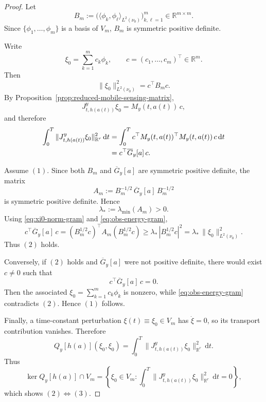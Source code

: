 \documentclass{article}
\theoremstyle{definition}
\renewcommand{\d}{\mathrm{d}}
\begin{document}
\begin{proof}
    Let
    \[
        B_m:=\bigl(\langle \phi_k,\phi_\ell\rangle_{L^2(\nu_0)}\bigr)_{k,\ell=1}^m
        \in \mathbb R^{m\times m}.
    \]
    Since \(\{\phi_1,\dots,\phi_m\}\) is a basis of \(V_m\), \(B_m\) is symmetric positive definite.

    Write
    \[
        \xi_0=\sum_{k=1}^m c_k\phi_k,
        \qquad
        c=(c_1,\dots,c_m)^\top\in\mathbb R^m.
    \]
    Then
    \begin{equation}
        \label{eq:xi0-norm-gram}
        \|\xi_0\|_{L^2(\nu_0)}^2
        =
        c^\top B_m c.
    \end{equation}
    By Proposition~\ref{prop:reduced-mobile-sensing-matrix},
    \[
        J_{t,h(a(t))}^{y}\xi_0
        =
        M_y(t,a(t))\,c,
    \]
    and therefore
    \begin{align}
        \int_0^T \|J_{t,h(a(t))}^{y}\xi_0\|_{\mathbb R^r}^2\,\d t
         & =
        \int_0^T c^\top M_y(t,a(t))^\top M_y(t,a(t))\,c\,\d t \notag \\
         & =
        c^\top \overline G_y[a]\,c.
        \label{eq:obs-energy-gram}
    \end{align}

    Assume \((1)\). Since both \(B_m\) and \(\overline G_y[a]\) are symmetric positive definite, the
    matrix
    \[
        A_m:=B_m^{-1/2}\,\overline G_y[a]\,B_m^{-1/2}
    \]
    is symmetric positive definite. Hence
    \[
        \lambda_*:=\lambda_{\min}(A_m)>0.
    \]
    Using \eqref{eq:xi0-norm-gram} and \eqref{eq:obs-energy-gram},
    \[
        c^\top \overline G_y[a]\,c
        =
        (B_m^{1/2}c)^\top A_m (B_m^{1/2}c)
        \ge
        \lambda_*\,|B_m^{1/2}c|^2
        =
        \lambda_*\,\|\xi_0\|_{L^2(\nu_0)}^2.
    \]
    Thus \((2)\) holds.

    Conversely, if \((2)\) holds and \(\overline G_y[a]\) were not positive definite, there would exist
    \(c\neq 0\) such that
    \[
        c^\top \overline G_y[a]\,c=0.
    \]
    Then the associated \(\xi_0=\sum_{k=1}^m c_k\phi_k\) is nonzero, while
    \eqref{eq:obs-energy-gram} contradicts \((2)\). Hence \((1)\) follows.

    Finally, a time-constant perturbation \(\xi(t)\equiv \xi_0\in V_m\) has \(\dot\xi=0\), so its
    transport contribution vanishes. Therefore
    \[
        Q_y[h(a)](\xi_0,\xi_0)
        =
        \int_0^T \|J_{t,h(a(t))}^{y}\xi_0\|_{\mathbb R^r}^2\,\d t.
    \]
    Thus
    \[
        \ker Q_y[h(a)]\cap V_m
        =
        \left\{
        \xi_0\in V_m:
        \int_0^T \|J_{t,h(a(t))}^{y}\xi_0\|_{\mathbb R^r}^2\,\d t=0
        \right\},
    \]
    which shows \((2)\Longleftrightarrow(3)\).
\end{proof}
\end{document}

